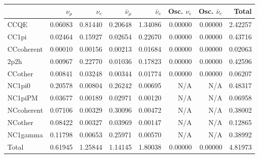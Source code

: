 \begin{tabular} { | l ||r | r | r | r | r | r | | r | }
\hline
              & $\nu_\mu$            & $\nu_e$              & $\bar{\nu}_{\mu}$    & $\bar{\nu}_{e}$      & Osc. $\nu_e$         & Osc. $\bar{\nu}_{e}$ & Total                \\ \hline\hline
 CCQE         & 0.06083              & 0.81440              & 0.20648              & 1.34086              & 0.00000              & 0.00000              & 2.42257              \\ \hline
 CC1pi        & 0.02464              & 0.15927              & 0.02654              & 0.22670              & 0.00000              & 0.00000              & 0.43716              \\ \hline
 CCcoherent   & 0.00010              & 0.00156              & 0.00213              & 0.01684              & 0.00000              & 0.00000              & 0.02063              \\ \hline
 2p2h         & 0.00967              & 0.22770              & 0.01036              & 0.17823              & 0.00000              & 0.00000              & 0.42596              \\ \hline
 CCother      & 0.00841              & 0.03248              & 0.00344              & 0.01774              & 0.00000              & 0.00000              & 0.06207              \\ \hline
 NC1pi0       & 0.20578              & 0.00804              & 0.26242              & 0.00695              & N/A                  & N/A                  & 0.48317              \\ \hline
 NC1piPM      & 0.03677              & 0.00189              & 0.02971              & 0.00120              & N/A                  & N/A                  & 0.06958              \\ \hline
 NCcoherent   & 0.07106              & 0.00329              & 0.30096              & 0.00472              & N/A                  & N/A                  & 0.38002              \\ \hline
 NCother      & 0.08422              & 0.00327              & 0.03969              & 0.00147              & N/A                  & N/A                  & 0.12865              \\ \hline
 NC1gamma     & 0.11798              & 0.00653              & 0.25971              & 0.00570              & N/A                  & N/A                  & 0.38992              \\ \hline
\hline
 Total        & 0.61945              & 1.25844              & 1.14145              & 1.80038              & 0.00000              & 0.00000              & 4.81973              \\ \hline

\end{tabular}
